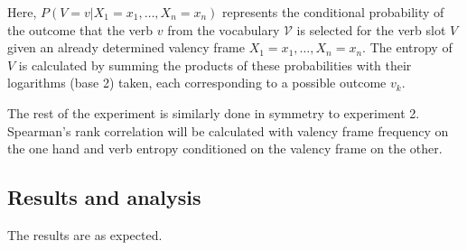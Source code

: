 Here, $P(V=v|X_1=x_1,\ldots,X_n=x_n)$ represents the conditional probability of the outcome that the verb $v$ from the vocabulary $\mathcal{V}$ is selected for the verb slot $V$ given an already determined valency frame $X_1=x_1,\ldots,X_n=x_n$. The entropy of $V$ is calculated by summing the products of these probabilities with their logarithms (base 2) taken, each corresponding to a possible outcome $v_k$.

The rest of the experiment is similarly done in symmetry to experiment 2. Spearman's rank correlation will be calculated with valency frame frequency on the one hand and verb entropy conditioned on the valency frame on the other. 

\subsection{Results and analysis}

The results are as expected.







